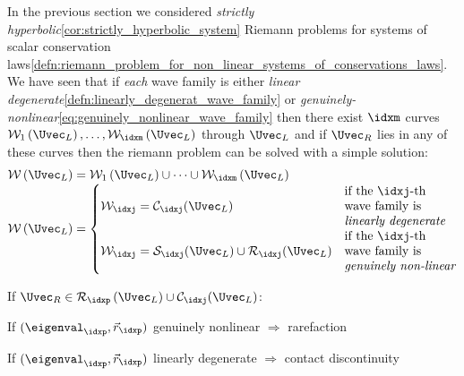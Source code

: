 \begin{sectionbox}\nospacing
   In the previous section we considered \textit{strictly hyperbolic}\cref{cor:strictly_hyperbolic_system} Riemann problems for systems of scalar conservation laws\cref{defn:riemann_problem_for_non_linear_systems_of_conservations_laws}.
   We have seen that if \textit{each} wave family is either \textit{linear degenerate}\cref{defn:linearly_degenerat_wave_family} or \textit{genuinely-nonlinear}\cref{eq:genuinely_nonlinear_wave_family} then there
   exist $\idxm$ curves $\mathcal{W}_{1}\left(\Uvec_{L}\right),\ldots,\mathcal{W}_{\idxm}\left(\Uvec_{L}\right)$ through $\Uvec_{L}$ and if $\Uvec_{R}$
   lies in any of these curves then the riemann problem can be solved with a simple solution:
   \begin{align}
     \mathcal{W}\left(\Uvec_{L}\right)&=\mathcal{W}_{1}\left(\Uvec_{L}\right)\cup\cdots\cup\mathcal{W}_{\idxm}\left(\Uvec_{L}\right)\\[-1\jot]
     \mathcal{W}\left(\Uvec_{L}\right)&=
     \begin{cases}
         \mathcal{W}_{\idxj}=\mathcal{C}_{\idxj}(\Uvec_{L})&
         \begin{aligned}
             &\text{if the $\idxj$-th}\\ &\text{wave family is}\\ &\text{\textit{linearly degenerate}}
         \end{aligned}\\
         \mathcal{W}_{\idxj}=\mathcal{S}_{\idxj}(\Uvec_{L})\cup\mathcal{R}_{\idxj}(\Uvec_{L})&
         \begin{aligned}
            &\text{if the $\idxj$-th}\\ &\text{wave family is}\\ &\text{\textit{genuinely non-linear}}
         \end{aligned}\\
     \end{cases}\nonumber
   \end{align}
   \begin{circlelistnosep}
       \item If $\Uvec_{R}\in\mathcal{R}_{\idxp}\left(\Uvec_{L}\right)\cup\mathcal{C}_{\idxj}(\Uvec_{L})$:
       \begin{itemizenosep}
           \item If $(\eigenval_{\idxp},\vec{r}_{\idxp})$ genuinely nonlinear $\Rightarrow$ rarefaction
           \item If $(\eigenval_{\idxp},\vec{r}_{\idxp})$ linearly degenerate $\Rightarrow$ contact discontinuity

\end{itemizenosep}
\end{circlelistnosep}
\end{sectionbox}
